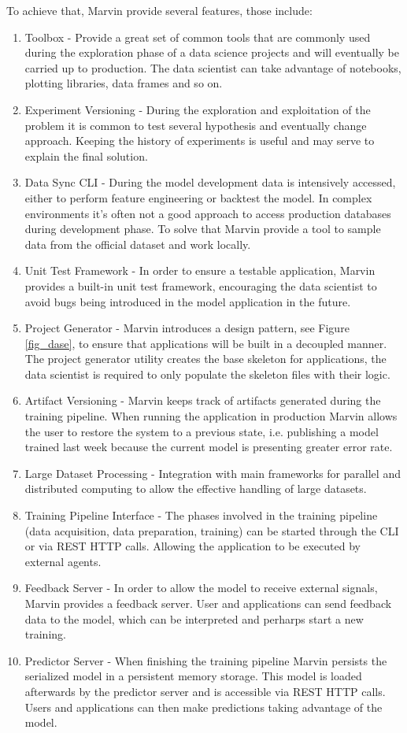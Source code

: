 \documentclass[twoside,11pt]{article}
\begin{document}
To achieve that, Marvin provide several features, those include:
\begin{enumerate}
    \item Toolbox - Provide a great set of common tools that are commonly used during the exploration phase of a data science projects and will eventually be carried up to production. The data scientist can take advantage of notebooks, plotting libraries, data frames and so on. 
    \item Experiment Versioning - During the exploration and exploitation of the problem it is common to test several hypothesis and eventually change approach. Keeping the history of experiments is useful and may serve to explain the final solution.
    \item Data Sync CLI - During the model development data is intensively accessed, either to perform feature engineering or backtest the model. In complex environments it's often not a good approach to access production databases during development phase. To solve that Marvin provide a tool to sample data from the official dataset and work locally.
    \item Unit Test Framework - In order to ensure a testable application, Marvin provides a built-in unit test framework, encouraging the data scientist to avoid bugs being introduced in the model application in the future.
    \item Project Generator - Marvin introduces a design pattern, see Figure \ref{fig_dase}, to ensure that applications will be built in a decoupled manner. The project generator utility creates the base skeleton for applications, the data scientist is required to only populate the skeleton files with their logic.
    \item Artifact Versioning - Marvin keeps track of artifacts generated during the training pipeline. When running the application in production Marvin allows the user to restore the system to a previous state, i.e. publishing a model trained last week because the current model is presenting greater error rate.
    \item Large Dataset Processing - Integration with main frameworks for parallel and distributed computing to allow the effective handling of large datasets.
    \item Training Pipeline Interface - The phases involved in the training pipeline (data acquisition, data preparation, training) can be started through the CLI or via REST HTTP calls. Allowing the application to be executed by external agents.
    \item Feedback Server - In order to allow the model to receive external signals, Marvin provides a feedback server. User and applications can send feedback data to the model, which can be interpreted and perharps start a new training.
    \item Predictor Server - When finishing the training pipeline Marvin persists the serialized model in a persistent memory storage. This model is loaded afterwards by the predictor server and is accessible via REST HTTP calls. Users and applications can then make predictions taking advantage of the model.
\end{enumerate}
\end{document}
